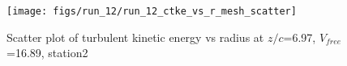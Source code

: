 \begin{figure}[H]
\centering
\texttt{[image: figs/run\_12/run\_12\_ctke\_vs\_r\_mesh\_scatter]}
\caption{Scatter plot of turbulent kinetic energy vs radius at $z/c$=6.97, $V_{free}$=16.89, station2}
\label{fig:run_12_ctke_vs_r_mesh_scatter}
\end{figure}


